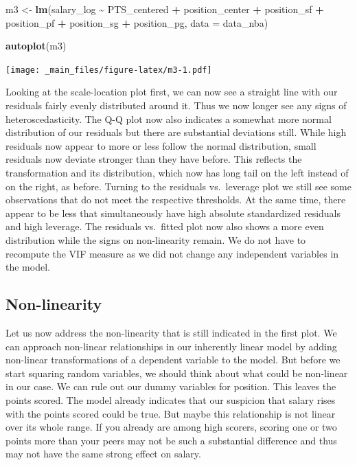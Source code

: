 \documentclass[
]{book}
\newenvironment{Shaded}{\begin{snugshade}}{\end{snugshade}}
\newcommand{\AttributeTok}[1]{\textcolor[rgb]{0.13,0.29,0.53}{#1}}
\newcommand{\FunctionTok}[1]{\textcolor[rgb]{0.13,0.29,0.53}{\textbf{#1}}}
\newcommand{\NormalTok}[1]{#1}
\newcommand{\OtherTok}[1]{\textcolor[rgb]{0.56,0.35,0.01}{#1}}
\newcommand{\SpecialCharTok}[1]{\textcolor[rgb]{0.81,0.36,0.00}{\textbf{#1}}}
\begin{document}
\begin{Shaded}
\begin{Highlighting}[]
\NormalTok{m3 }\OtherTok{\textless{}{-}} \FunctionTok{lm}\NormalTok{(salary\_log }\SpecialCharTok{\textasciitilde{}}\NormalTok{ PTS\_centered }\SpecialCharTok{+}\NormalTok{ position\_center }\SpecialCharTok{+}\NormalTok{ position\_sf }\SpecialCharTok{+}\NormalTok{  position\_pf }\SpecialCharTok{+}\NormalTok{ position\_sg }\SpecialCharTok{+}\NormalTok{ position\_pg, }\AttributeTok{data =}\NormalTok{ data\_nba)}

\FunctionTok{autoplot}\NormalTok{(m3)}
\end{Highlighting}
\end{Shaded}

\texttt{[image: \_main\_files/figure-latex/m3-1.pdf]}

Looking at the scale-location plot first, we can now see a straight line with
our residuals fairly evenly distributed around it. Thus we now longer see any
signs of heteroscedasticity. The Q-Q plot now also indicates a somewhat more
normal distribution of our residuals but there are substantial deviations still.
While high residuals now appear to more or less follow the normal distribution,
small residuals now deviate stronger than they have before. This reflects the
transformation and its distribution, which now has long tail on the left instead of
on the right, as before. Turning to the residuals vs.~leverage plot we still see
some observations that do not meet the respective thresholds. At the same time,
there appear to be less that simultaneously have high absolute standardized
residuals and high leverage. The residuals vs.~fitted plot now also shows a more
even distribution while the signs on non-linearity remain. We do not have to
recompute the VIF measure as we did not change any independent variables in the
model.

\hypertarget{non-linearity}{%
\subsection{Non-linearity}\label{non-linearity}}

Let us now address the non-linearity that is still indicated in the first plot.
We can approach non-linear relationships in our inherently linear model by
adding non-linear transformations of a dependent variable to the model. But
before we start squaring random variables, we should think about what could be
non-linear in our case. We can rule out our dummy variables for position. This
leaves the points scored. The model already indicates that our suspicion that
salary rises with the points scored could be true. But maybe this relationship
is not linear over its whole range. If you already are among high scorers,
scoring one or two points more than your peers may not be such a substantial
difference and thus may not have the same strong effect on salary.
\end{document}
